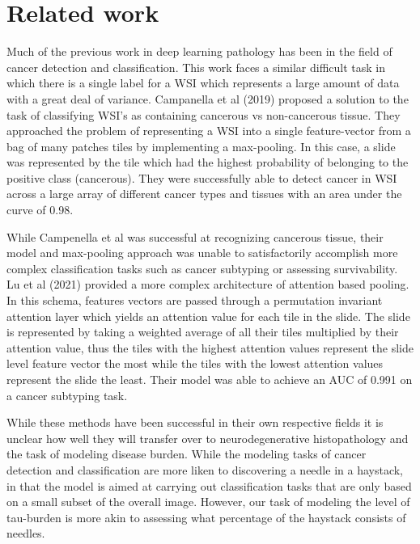 \documentclass{article} %
\begin{document}

\section{Related work}
\label{rel_work}
Much of the previous work in deep learning pathology has been in the field of cancer detection and classification. This work faces a similar difficult task in which there is a single label for a WSI which represents a large amount of data with a great deal of variance. 
Campanella et al (2019) proposed a solution to the task of classifying WSI’s as containing cancerous vs non-cancerous tissue. They approached the problem of representing a WSI into a single feature-vector from a bag of many patches tiles by implementing a max-pooling. In this case, a slide was represented by the tile which had the highest probability of belonging to the positive class (cancerous). They were successfully able to detect cancer in WSI across a large array of different cancer types and tissues with an area under the curve of 0.98. 

While Campenella et al was successful at recognizing cancerous tissue, their model and max-pooling approach was unable to satisfactorily accomplish more complex classification tasks such as cancer subtyping or assessing survivability. Lu et al (2021) provided a more complex architecture of attention based pooling. In this schema, features vectors are passed through a permutation invariant attention layer which yields an attention value for each tile in the slide. The slide is represented by taking a weighted average of all their tiles multiplied by their attention value, thus the tiles with the highest attention values represent the slide level feature vector the most while the tiles with the lowest attention values represent the slide the least. Their model was able to achieve an AUC of 0.991 on a cancer subtyping task.

While these methods have been successful in their own respective fields it is unclear how well they will transfer over to neurodegenerative histopathology and the task of modeling disease burden. While the modeling tasks of cancer detection and classification are more liken to discovering a needle in a haystack, in that the model is aimed at carrying out classification tasks that are only based on a small subset of the overall image. However, our task of modeling the level of tau-burden is more akin to assessing what percentage of the haystack consists of needles.
\end{document}
